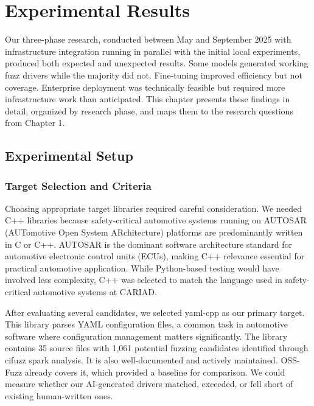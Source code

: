 
\chapter{Experimental Results}
\label{chap:results}

Our three-phase research, conducted between May and September 2025 with infrastructure integration running in parallel with the initial local experiments, produced both expected and unexpected results. Some models generated working fuzz drivers while the majority did not. Fine-tuning improved efficiency but not coverage. Enterprise deployment was technically feasible but required more infrastructure work than anticipated. This chapter presents these findings in detail, organized by research phase, and maps them to the research questions from Chapter 1.


\section{Experimental Setup}
\label{sec:exp_setup}

\subsection{Target Selection and Criteria}
\label{sec:exp_targets}

Choosing appropriate target libraries required careful consideration. We needed C++ libraries because safety-critical automotive systems running on AUTOSAR (AUTomotive Open System ARchitecture) \cite{autosar} platforms are predominantly written in C or C++. AUTOSAR is the dominant software architecture standard for automotive electronic control units (ECUs), making C++ relevance essential for practical automotive application. While Python-based testing would have involved less complexity, C++ was selected to match the language used in safety-critical automotive systems at CARIAD.

After evaluating several candidates, we selected yaml-cpp as our primary target. This library parses YAML configuration files, a common task in automotive software where configuration management matters significantly. The library contains 35 source files with 1,061 potential fuzzing candidates identified through cifuzz spark analysis. It is also well-documented and actively maintained. OSS-Fuzz \cite{OSSFuzzBugs2021} already covers it, which provided a baseline for comparison. We could measure whether our AI-generated drivers matched, exceeded, or fell short of existing human-written ones.

